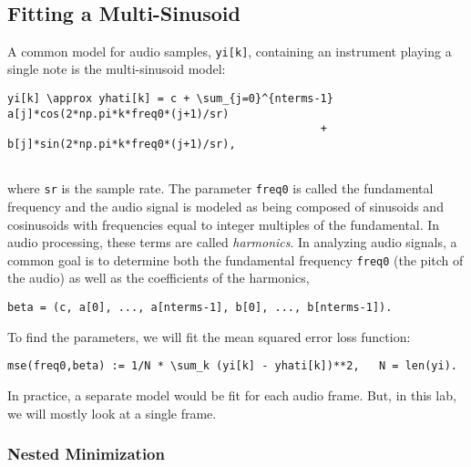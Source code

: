 \documentclass[11pt]{article}
\begin{document}
    \begin{center}
    \end{center}
    { \hspace*{\fill} \\}
    
    \subsection{Fitting a Multi-Sinusoid}\label{fitting-a-multi-sinusoid}

A common model for audio samples, \texttt{yi{[}k{]}}, containing an
instrument playing a single note is the multi-sinusoid model:

\begin{verbatim}
yi[k] \approx yhati[k] = c + \sum_{j=0}^{nterms-1} a[j]*cos(2*np.pi*k*freq0*(j+1)/sr) 
                                                +  b[j]*sin(2*np.pi*k*freq0*(j+1)/sr),
    
\end{verbatim}

where \texttt{sr} is the sample rate. The parameter \texttt{freq0} is
called the fundamental frequency and the audio signal is modeled as
being composed of sinusoids and cosinusoids with frequencies equal to
integer multiples of the fundamental. In audio processing, these terms
are called \emph{harmonics}. In analyzing audio signals, a common goal
is to determine both the fundamental frequency \texttt{freq0} (the pitch
of the audio) as well as the coefficients of the harmonics,

\begin{verbatim}
beta = (c, a[0], ..., a[nterms-1], b[0], ..., b[nterms-1]).
\end{verbatim}

To find the parameters, we will fit the mean squared error loss
function:

\begin{verbatim}
mse(freq0,beta) := 1/N * \sum_k (yi[k] - yhati[k])**2,   N = len(yi).
\end{verbatim}

In practice, a separate model would be fit for each audio frame. But, in
this lab, we will mostly look at a single frame.

\subsubsection{Nested Minimization}\label{nested-minimization}
\end{document}
